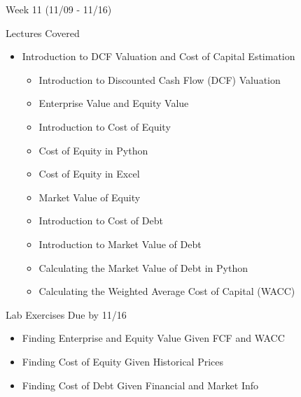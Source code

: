 \documentclass[]{article}
\begin{document}
\begin{section}{Week 11 (11/09 - 11/16)}
\begin{subsection}{Lectures Covered}
\begin{itemize}
\item Introduction to DCF Valuation and Cost of Capital Estimation
\begin{itemize}
\item Introduction to Discounted Cash Flow (DCF) Valuation
\item Enterprise Value and Equity Value
\item Introduction to Cost of Equity
\item Cost of Equity in Python
\item Cost of Equity in Excel
\item Market Value of Equity
\item Introduction to Cost of Debt
\item Introduction to Market Value of Debt
\item Calculating the Market Value of Debt in Python
\item Calculating the Weighted Average Cost of Capital (WACC)
\end{itemize}
\end{itemize}
\end{subsection}
\begin{subsection}{Lab Exercises Due by 11/16}
\begin{itemize}
\item Finding Enterprise and Equity Value Given FCF and WACC
\item Finding Cost of Equity Given Historical Prices
\item Finding Cost of Debt Given Financial and Market Info
\end{itemize}
\end{subsection}
\end{section}
\end{document}
